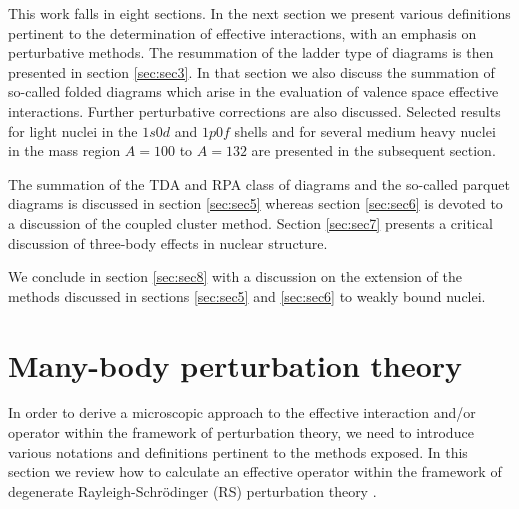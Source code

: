 \documentclass[twoside,12pt]{article}
\begin{document}
This work falls in eight sections.
In the next section we present various definitions pertinent
to the determination of effective interactions, with an emphasis
on perturbative methods.
The resummation of the ladder type of
diagrams is then presented in section \ref{sec:sec3}.
In that section we also discuss the summation of so-called
folded diagrams which arise in the evaluation of
valence space effective interactions. Further perturbative
corrections are also discussed. Selected results
for light nuclei in the $1s0d$ and $1p0f$ shells and for
several medium heavy nuclei in the mass region $A=100$ to $A=132$
are presented in the subsequent section.

The summation of the TDA and RPA class of diagrams and the so-called
parquet diagrams is discussed in
section \ref{sec:sec5} whereas section \ref{sec:sec6} is devoted to a discussion
of the coupled cluster method. Section \ref{sec:sec7} presents a critical discussion
of three-body effects in nuclear structure.

We conclude in section \ref{sec:sec8} with a discussion
on the extension of the methods discussed in sections \ref{sec:sec5} and
\ref{sec:sec6} to weakly bound nuclei.   



\section{Many-body perturbation theory}
\label{sec:sec2}


In order to derive a microscopic approach to the effective interaction and/or operator
within the framework of perturbation theory, we need to introduce various
notations and definitions pertinent to the methods exposed.
In this section we review how to calculate an effective
operator within the framework of
degenerate Rayleigh-Schr\"{o}dinger
(RS) perturbation theory \cite{ko90,lm85}.
\end{document}
